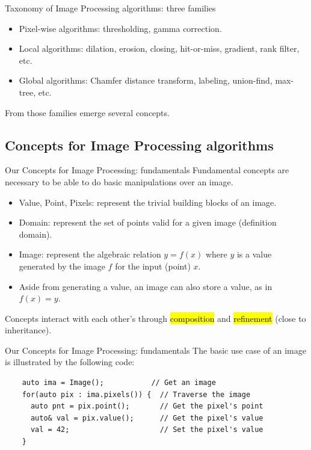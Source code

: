 \documentclass[12pt,aspectratio=169]{beamer}
\makeatletter
\let\HL\hl
\renewcommand\hl{%
  \let\set@color\beamerorig@set@color
  \let\reset@color\beamerorig@reset@color
  \HL}
\makeatother
\begin{document}
\begin{frame}[fragile]{Taxonomy of Image Processing algorithms: three families}
  \begin{itemize}
    \item Pixel-wise algorithms: thresholding, gamma correction.
    \item Local algorithms: dilation, erosion, closing, hit-or-miss, gradient, rank filter, etc.
    \item Global algorithms: Chamfer distance transform, labeling, union-find, max-tree, etc.
  \end{itemize}
  From those families emerge several concepts.
\end{frame}

\subsection{Concepts for Image Processing algorithms}

\begin{frame}[fragile]{Our Concepts for Image Processing: fundamentals}
  Fundamental concepts are necessary to be able to do basic manipulations over an image.
  \begin{itemize}
    \item Value, Point, Pixels: represent the trivial building blocks of an image.
    \item Domain: represent the set of points valid for a given image (definition domain).
    \item Image: represent the algebraic relation \(y = f(x)\) where \(y\) is a value generated by the image \(f\) for
          the input (point) \(x\).
    \item Aside from generating a value, an image can also store a value, as in \(f(x) = y\).
  \end{itemize}
  Concepts interact with each other's through \hl{composition} and \hl{refinement} (close to inheritance).
\end{frame}

\begin{frame}[fragile]{Our Concepts for Image Processing: fundamentals}
  The basic use case of an image is illustrated by the following code:
  \begin{verbatim}
    auto ima = Image();           // Get an image
    for(auto pix : ima.pixels()) {  // Traverse the image
      auto pnt = pix.point();       // Get the pixel's point
      auto& val = pix.value();      // Get the pixel's value
      val = 42;                     // Set the pixel's value
    }
  \end{verbatim}
\end{frame}
\end{document}
